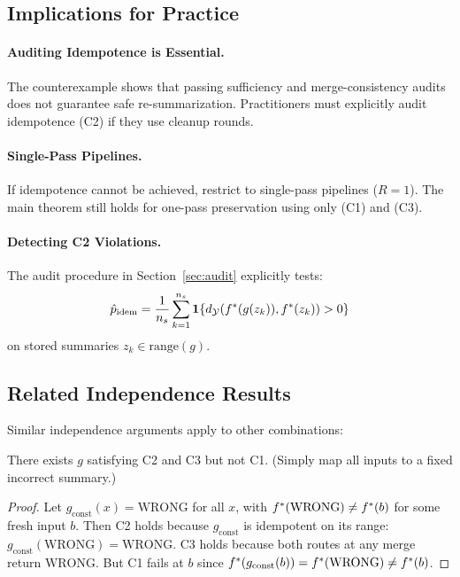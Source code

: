 \subsection{Implications for Practice}

\paragraph{Auditing Idempotence is Essential.}
The counterexample shows that passing sufficiency and merge-consistency audits does not guarantee safe re-summarization. Practitioners must explicitly audit idempotence (C2) if they use cleanup rounds.

\paragraph{Single-Pass Pipelines.}
If idempotence cannot be achieved, restrict to single-pass pipelines ($R = 1$). The main theorem still holds for one-pass preservation using only (C1) and (C3).

\paragraph{Detecting C2 Violations.}
The audit procedure in Section~\ref{sec:audit} explicitly tests:
\[
\hat{p}_{\text{idem}} = \frac{1}{n_s} \sum_{k=1}^{n_s} \mathbf{1}\{d_{\mathcal{Y}}(f^{\ast}(g(z_k)), f^{\ast}(z_k)) > 0\}
\]
on stored summaries $z_k \in \text{range}(g)$.

\subsection{Related Independence Results}

Similar independence arguments apply to other combinations:

\begin{proposition}[C1 is Independent of C2, C3]
There exists $g$ satisfying C2 and C3 but not C1. (Simply map all inputs to a fixed incorrect summary.)
\end{proposition}

\begin{proof}
Let $g_{\text{const}}(x)=\text{WRONG}$ for all $x$, with $f^{\ast}(\text{WRONG})\ne f^{\ast}(b)$ for some fresh input $b$. Then C2 holds because $g_{\text{const}}$ is idempotent on its range: $g_{\text{const}}(\text{WRONG})=\text{WRONG}$. C3 holds because both routes at any merge return $\text{WRONG}$. But C1 fails at $b$ since $f^{\ast}(g_{\text{const}}(b))=f^{\ast}(\text{WRONG})\ne f^{\ast}(b)$.
\end{proof}

